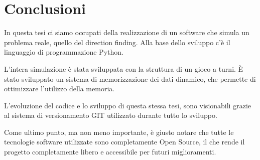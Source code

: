\chapter*{Conclusioni}
In questa tesi ci siamo occupati della realizzazione di un software che simula un problema reale, quello del direction finding. Alla base dello sviluppo c'è il linguaggio di programmazione Python.

L'intera simulazione è stata sviluppata con la struttura di un gioco a turni.
È stato sviluppato un sistema di memorizzazione dei dati dinamico, che permette di ottimizzare l'utilizzo della memoria.

L'evoluzione del codice e lo sviluppo di questa stessa tesi, sono visionabili grazie al sistema di versionamento GIT utilizzato durante tutto lo sviluppo.

Come ultimo punto, ma non meno importante, è giusto notare che tutte le tecnologie software utilizzate sono completamente Open Source, il che rende il progetto completamente libero e accessibile per futuri miglioramenti.